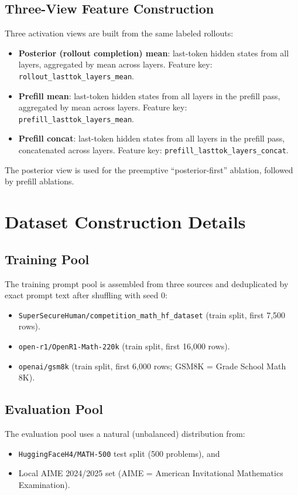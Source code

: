 \documentclass[11pt]{article}
\begin{document}
\subsection*{Three-View Feature Construction}
Three activation views are built from the same labeled rollouts:
\begin{itemize}
  \item \textbf{Posterior (rollout completion) mean}: last-token hidden states from all layers,
  aggregated by mean across layers. Feature key: \texttt{rollout\_lasttok\_layers\_mean}.
  \item \textbf{Prefill mean}: last-token hidden states from all layers in the prefill pass,
  aggregated by mean across layers. Feature key: \texttt{prefill\_lasttok\_layers\_mean}.
  \item \textbf{Prefill concat}: last-token hidden states from all layers in the prefill pass,
  concatenated across layers. Feature key: \texttt{prefill\_lasttok\_layers\_concat}.
\end{itemize}
The posterior view is used for the preemptive ``posterior-first'' ablation, followed by prefill ablations.

\section*{Dataset Construction Details}
\subsection*{Training Pool}
The training prompt pool is assembled from three sources and deduplicated by exact prompt text
after shuffling with seed 0:
\begin{itemize}
  \item \texttt{SuperSecureHuman/competition\_math\_hf\_dataset} (train split, first 7{,}500 rows).
  \item \texttt{open-r1/OpenR1-Math-220k} (train split, first 16{,}000 rows).
  \item \texttt{openai/gsm8k} (train split, first 6{,}000 rows; GSM8K = Grade School Math 8K).
\end{itemize}

\subsection*{Evaluation Pool}
The evaluation pool uses a natural (unbalanced) distribution from:
\begin{itemize}
  \item \texttt{HuggingFaceH4/MATH-500} test split (500 problems), and
  \item Local AIME 2024/2025 set (AIME = American Invitational Mathematics Examination).
\end{itemize}
\end{document}
